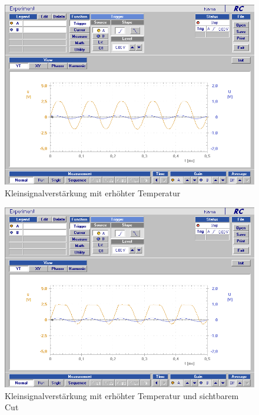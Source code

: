 \documentclass[12pt,a4paper]{article}
\begin{document}
\begin{figure}[H]
	\centering
	\includegraphics[scale=0.5]{./data/Braun_Kurz_PS8/Kleinsignalverstaerkung_Temp.png}
	\caption{Kleinsignalverstärkung mit erhöhter Temperatur}
	\label{fig:kleinsignalverstaerkung_temp}
\end{figure}

\begin{figure}[H]
	\centering
	\includegraphics[scale=0.5]{./data/Braun_Kurz_PS8/Kleinsignalverstaerkung_Temp_Cut.png}
	\caption{Kleinsignalverstärkung mit erhöhter Temperatur und sichtbarem Cut}
	\label{fig:kleinsignalverstaerkung_temp_cut}
\end{figure}
\end{document}
